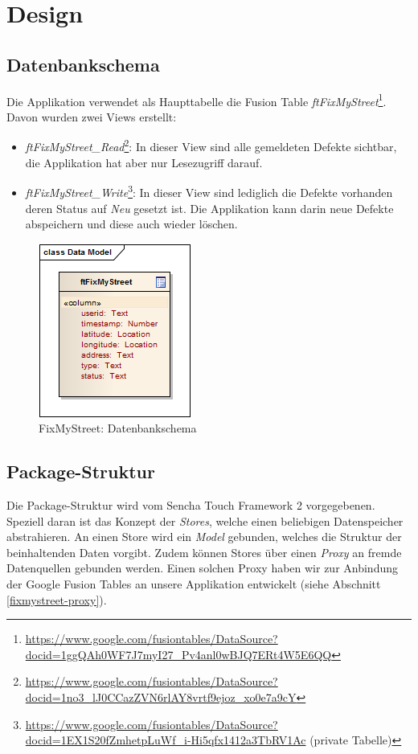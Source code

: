 \section{Design}

\subsection{Datenbankschema}
Die Applikation verwendet als Haupttabelle die Fusion Table \emph{ftFixMyStreet}\footnote{\url{https://www.google.com/fusiontables/DataSource?docid=1ggQAh0WF7J7myI27_Pv4anl0wBJQ7ERt4W5E6QQ}}. Davon wurden zwei Views erstellt:

\begin{itemize}
\item \emph{ftFixMyStreet\_Read}\footnote{\url{https://www.google.com/fusiontables/DataSource?docid=1no3_lJ0CCazZVN6rlAY8vrtf9ejoz_xo0e7a9cY}}: In dieser View sind alle gemeldeten Defekte sichtbar, die Applikation hat aber nur Lesezugriff darauf.
\item \emph{ftFixMyStreet\_Write}\footnote{\url{https://www.google.com/fusiontables/DataSource?docid=1EX1S20fZmhetpLuWf_i-Hi5qfx1412a3TbRV1Ac} (private Tabelle)}: In dieser View sind lediglich die Defekte vorhanden deren Status auf \emph{Neu} gesetzt ist. Die Applikation kann darin neue Defekte abspeichern und diese auch wieder löschen.
\end{itemize}

\begin{figure}[H]
	\centering
	\includegraphics[scale=0.8]{images/usecase2-fixmystreet/uml/fixmystreet-datamodel}
	\caption{FixMyStreet: Datenbankschema}
	\label{fixmystreet-datamodel}
\end{figure}

\subsection{Package-Struktur}
Die Package-Struktur wird vom Sencha Touch Framework 2 vorgegebenen. Speziell daran ist das Konzept der \emph{Stores}, welche einen beliebigen Datenspeicher abstrahieren. An einen Store wird ein \emph{Model} gebunden, welches die Struktur der beinhaltenden Daten vorgibt. Zudem können Stores über einen \emph{Proxy} an fremde Datenquellen gebunden werden. Einen solchen Proxy haben wir zur Anbindung der Google Fusion Tables an unsere Applikation entwickelt (siehe Abschnitt \ref{fixmystreet-proxy}).

